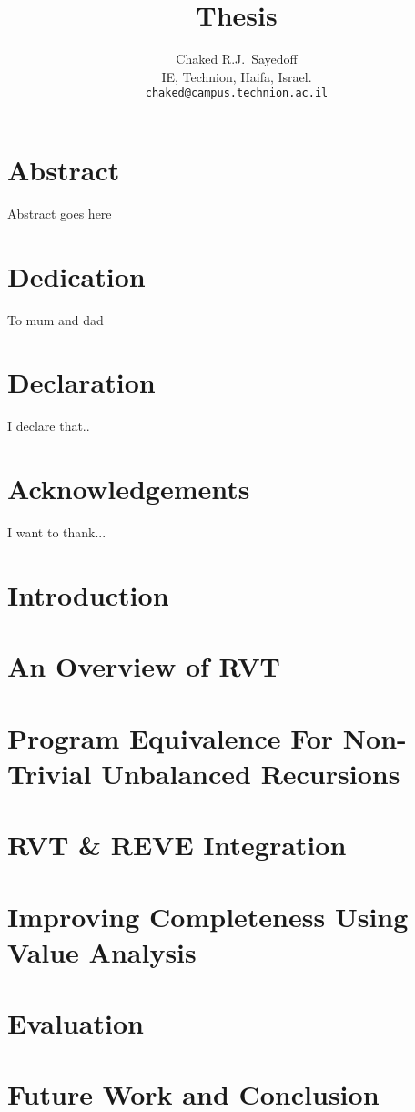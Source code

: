 \documentclass[12pt]{report}
\title{Thesis}
\author{
  Chaked R.J.~Sayedoff \\
  IE, Technion, Haifa, Israel.\\
    \texttt{chaked@campus.technion.ac.il}\\
}
\begin{document}
\maketitle
\chapter*{Abstract}
Abstract goes here

\chapter*{Dedication}
To mum and dad

\chapter*{Declaration}
I declare that..

\chapter*{Acknowledgements}
I want to thank...

\tableofcontents

\chapter{Introduction}


\chapter{An Overview of RVT}


\chapter{Program Equivalence For Non-Trivial Unbalanced Recursions}


\chapter{RVT & REVE Integration}


\chapter{Improving Completeness Using Value Analysis}


\chapter{Evaluation}


\chapter{Future Work and Conclusion}






  

\end{document}
